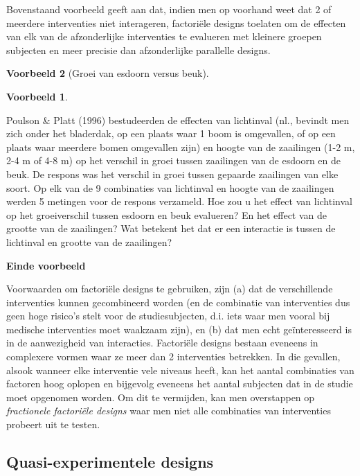 \documentclass[
  12pt,dutch,coursenotes]{book}
\theoremstyle{definition}
\theoremstyle{definition}
\newtheorem{example}{Voorbeeld}[chapter]
\theoremstyle{definition}
\theoremstyle{remark}
\begin{document}
Bovenstaand voorbeeld geeft aan dat, indien men op voorhand weet dat 2 of meerdere interventies niet
interageren, factoriële designs toelaten om de effecten van elk van de
afzonderlijke interventies te evalueren met kleinere groepen subjecten en
meer precisie dan afzonderlijke parallelle designs.

\begin{example}[Groei van esdoorn versus beuk]
\begin{example}

\protect\hypertarget{exm:unnamed-chunk-80}{}{\label{exm:unnamed-chunk-80} \iffalse (Groei van esdoorn versus beuk) \fi{} }

\end{example}
\end{example}

Poulson \& Platt (1996) bestudeerden de effecten van lichtinval (nl., bevindt men zich onder het bladerdak, op een plaats waar 1 boom is omgevallen, of op een plaats waar meerdere bomen omgevallen zijn) en hoogte van de zaailingen (1-2 m, 2-4 m of 4-8 m) op het verschil in groei tussen zaailingen van de esdoorn en de beuk. De respons was het verschil in groei tussen gepaarde zaailingen van elke soort. Op elk van de 9 combinaties van lichtinval en hoogte van de zaailingen werden 5 metingen voor de respons verzameld. Hoe zou
u het effect van lichtinval op het groeiverschil tussen esdoorn en beuk evalueren?
En het effect van de grootte van de zaailingen? Wat betekent het dat er een
interactie is tussen de lichtinval en grootte van de zaailingen?

\textbf{Einde voorbeeld}

Voorwaarden om factoriële designs te gebruiken, zijn (a) dat de
verschillende interventies kunnen gecombineerd worden (en de combinatie van
interventies dus geen hoge risico's stelt voor de studiesubjecten, d.i. iets waar men vooral bij medische interventies moet waakzaam zijn), en (b) dat men
echt geïnteresseerd is in de aanwezigheid van interacties. Factoriële designs bestaan eveneens in complexere vormen waar ze meer dan 2 interventies betrekken. In die gevallen, alsook wanneer elke interventie vele niveaus heeft, kan het aantal combinaties van factoren hoog oplopen en bijgevolg eveneens het aantal subjecten dat in de studie moet opgenomen worden. Om dit te vermijden, kan men overstappen op \emph{fractionele factoriële designs} waar men niet alle combinaties van interventies probeert uit te testen.

\hypertarget{quasi-experimentele-designs}{%
\subsection{Quasi-experimentele designs}\label{quasi-experimentele-designs}}
\end{document}

